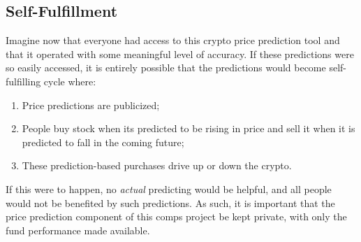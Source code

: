 \documentclass[10pt,twocolumn]{article}
\begin{document}
\subsection{Self-Fulfillment}

Imagine now that everyone had access to this crypto price prediction tool and that it operated with some meaningful level of accuracy. If these predictions were so easily accessed, it is entirely possible that the predictions would become self-fulfilling cycle where:

\begin{enumerate}
    \item Price predictions are publicized;
    \item People buy stock when its predicted to be rising in price and sell it when it is predicted to fall in the coming future;
    \item These prediction-based purchases drive up or down the crypto.
\end{enumerate}

If this were to happen, no \textit{actual} predicting would be helpful, and all people would not be benefited by such predictions. As such, it is important that the price prediction component of this comps project be kept private, with only the fund performance made available.


\printbibliography 
\end{document}
